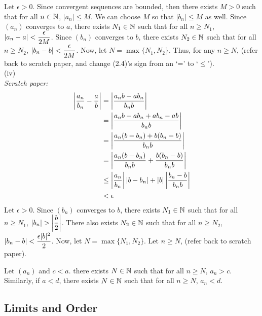 {Let \(\epsilon > 0\). Since convergent sequences are bounded, then there exists $M > 0$ such that for all $n \in \mathbb{N}$, $|a_n| \leq M$. We can choose \(M\) so that \(|b_n| \leq M\) as well. Since $(a_n)$ converges to $a$, there exists $N_1 \in \mathbb{N}$ such that for all $n \geq N_1$, $\displaystyle\left|a_n - a\right| < \frac{\epsilon}{2M}$. Since $(b_n)$ converges to $b$, there exists $N_2 \in \mathbb{N}$ such that for all $n \geq N_2$, $\displaystyle\left|b_n - b\right| < \frac{\epsilon}{2M}$. Now, let $N = \max\{N_1, N_2\}$. Thus, for any $n \geq N$, (refer back to scratch paper, and change (2.4)'s sign from an `=' to `$\leq$'). \\

(iv) \\
\textit{Scratch paper:}
\begin{align*}
    \displaystyle\left|\frac{a_n}{b_n} - \frac{a}{b}\right| & = \displaystyle\left|\frac{a_nb - ab_n}{b_nb}\right|                                                     \\
                                           & = \displaystyle\left|\frac{a_nb - ab_n + ab_n - ab}{b_nb}\right|                                         \\
                                           & = \displaystyle\left|\frac{a_n(b - b_n) + b(b_n - b)}{b_nb}\right|                                       \\
                                           & = \displaystyle\left|\frac{a_n(b - b_n)}{b_nb} + \frac{b(b_n - b)}{b_nb}\right|                          \\
                                           & \leq \displaystyle\left|\frac{a_n}{b_n}\right|\displaystyle\left|b - b_n\right| + \displaystyle\left|b\right|\displaystyle\left|\frac{b_n - b}{b_nb}\right| \\
                                           & < \epsilon
\end{align*}
Let \(\epsilon > 0\). Since \((b_n)\) converges to \(b\), there exists \(N_1 \in \mathbb{N}\) such that for all \(n \geq N_1\), \(\displaystyle\left|b_n \right| > \displaystyle\left|\frac{b}{2}\right|\). There also exists \(N_2 \in \mathbb{N}\) such that for all \(n \geq N_2\), \(\displaystyle\left|b_n - b\right| < \frac{\epsilon|b|^{2}}{2}\). Now, let \(N = \max\{N_1, N_2\}\). Let \(n \geq N\), (refer back to scratch paper). \qedhere
}

\begin{lemma}
    Let \((a_n)\) and \(c < a\). there exists \(N \in \mathbb{N}\) such that for all \(n \geq N\), \(a_n > c\). Similarly, if \(a < d\), there exists \(N \in \mathbb{N}\) such that for all \(n \geq N\), \(a_n < d\).
\end{lemma}

\subsection{Limits and Order}

